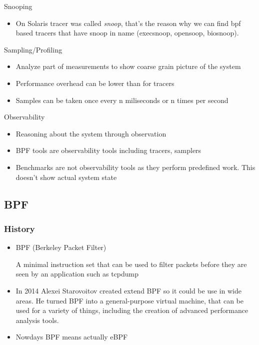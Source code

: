 \documentclass{beamer}
\begin{document}
\begin{frame}
  \begin{block}{Snooping}
    \begin{itemize}
      \item On Solaris tracer was called \emph{snoop}, that's the reason why we can find bpf based tracers that have snoop in name (execsnoop, opensoop, biosnoop).
    \end{itemize}
  \end{block}
\end{frame}


\begin{frame}
  \begin{block}{Sampling/Profiling}
    \begin{itemize}
      \item<+-> Analyze part of measurements to show coarse grain picture of the system
      \item<+-> Performance overhead can be lower than for tracers
      \item<+-> Samples can be taken once every n miliseconds or n times per second 
    \end{itemize}
  \end{block} 
\end{frame}


\begin{frame}
  \begin{block}{Observability}
    \begin{itemize}
      \item<+-> Reasoning about the system through observation
      \item<+-> BPF tools are observability tools including tracers, samplers
      \item<+-> Benchmarks are not observability tools as they perform predefined work. This doesn't show actual system state
    \end{itemize}
  \end{block} 
\end{frame}


\subsection{BPF} %

\begin{frame}
\frametitle{History}
\begin{itemize}
\item<1->
BPF (Berkeley Packet Filter)

A minimal instruction set that can be used to filter packets before they are seen by an application such
as tcpdump
\item<2->
In 2014 Alexei Starovoitov created extend BPF so it could be use in wide areas.
He turned BPF into a general-purpose virtual machine, that can be used for a variety of things,
including the creation of advanced performance analysis tools.
\item<3-> Nowdays BPF means actually eBPF
\end{itemize}
\end{frame}
\end{document}

